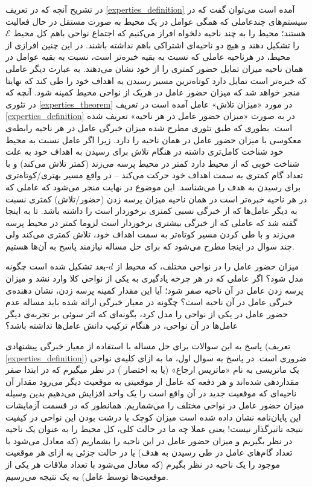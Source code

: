 در تشریح آنچه که در تعریف
\ref{experties_definition}
آمده است می‌توان گفت که در سیستم‌های چندعاملی که همگی عوامل در یک محیط به صورت مستقل در حال فعالیت هستند؛ محیط را به چند ناحیه دلخواه افراز می‌کنیم که اجتماع نواحی باهم کل محیط $\mathcal{E}$ را تشکیل دهند و هیچ دو ناحیه‌ای اشتراکی باهم نداشته باشند. در این چنین افرازی از محیط، در هرناحیه عاملی که نسبت به بقیه خبره‌تر است، نسبت به بقیه عوامل در همان ناحیه میزان تمایل حضور کمتری را از خود نشان می‌دهند. به عبارت دیگر عاملی که خبره‌تر است تمایل دارد کوتاه‌ترین مسیر رسیدن به اهداف خود را طی کند که نهایتا منجر خواهد شد که میزان حضور عامل در هریک از نواحی محیط کمینه شود.
آنچه که در تئوری
\ref{experties_theorem}
در مورد «میزان تلاش» عامل آمده است در تعریف
\ref{experties_definition}
در به صورت «میزان حضور عامل در هر ناحیه» تعریف شده است. بطوری که طبق تئوری مطرح شده میزان خبرگی عامل در هر ناحیه رابطه‌ی معکوسی با میزان حضور عامل در همان ناحیه را دارد. زیرا اگر عامل نسبت به محیط خود شناخت کامل‌تری داشته در هنگام تلاش برای رسیدن به اهداف خود به علت شناخت خوبی که از محیط دارد کمتر در محیط پرسه می‌زند (کمتر تلاش می‌کند) و با تعداد گام کمتری به سمت اهداف خود حرکت می‌کند -- در واقع مسیر بهتری/کوتاه‌تری برای رسیدن به هدف را می‌شناسد. این موضوع در نهایت منجر می‌شود که عاملی که در هر ناحیه خبره‌تر است در همان ناحیه میزان پرسه زدن (حضور/تلاش) کمتری نسبت به دیگر عامل‌ها که از خبرگی نسبی کمتری برخوردار است را داشته باشد.
تا به اینجا گفته شد که عاملی که از خبرگی بیشتری برخوردار است لزوما کمتر در محیط پرسه می‌زند و با طی کردن مسیر کوتاه‌تر به سمت اهداف خود، تلاش کمتری می‌کند ولی چند سوال در اینجا مطرح می‌شود که برای حل مساله نیازمند پاسخ به آن‌ها هستیم.
\begin{enumerate}
 میزان حضور عامل را در نواحی مختلف، که محیط از $d$-بعد تشکیل شده است چگونه مدل شود؟
 اگر عاملی که در هر چرخه یادگیری به یکی از نواحی کلا وارد نشد و میزان پرسه زدن عامل در آن ناحیه صفر شود؛ آیا این مقدار کمینه پرسه زدن، نشان دهنده‌ی خبرگی عامل در آن ناحیه است؟
 چگونه در معیار خبرگی ارائه شده باید مساله عدم حضور عامل در یکی از نواحی را مدل کرد، بگونه‌ای که اثر سوئی بر تجربه‌ی دیگر عامل‌ها در آن نواحی، در هنگام ترکیب دانش عامل‌ها نداشته باشد؟
\end{enumerate}
پاسخ به این سوالات برای حل مساله با استفاده از معیار خبرگی پیشنهادی (تعریف \ref{experties_definition}) ضروری است. در پاسخ به سوال اول، ما به ازای کلیه‌ی نواحی یک ماتریسی به نام «ماتریس ارجاع» (یا به اختصار ) در نظر میگیرم که در ابتدا صفر مقداردهی شده‌اند و هر دفعه که عامل از موقعیتی‌ به موقعیت دیگر می‌رود مقدار آن ناحیه‌ای که موقعیت جدید در آن واقع است را یک واحد افزایش می‌دهیم بدین وسیله میزان حضور عامل در نواحی مختلف را می‌شماریم. همانطور که در قسمت آزمایشات این پایان‌نامه نشان داده شده است میزان کوچک یا درشت بودن این نواحی در کیفیت نتیجه تاثیرگذار نیست! یعنی عملا چه ما در حالت کلی، کل محیط را به عنوان یک ناحیه در نظر بگیریم و میزان حضور عامل در این ناحیه را بشماریم (که معادل می‌شود با تعداد گام‌های عامل در طی رسیدن به هدف) یا در حالت جزئی به ازای هر موقعیت موجود را یک ناحیه در نظر بگیرم (که معادل می‌شود با تعداد ملاقات هر یکی از موقعیت‌ها توسط عامل) به یک نتیجه می‌رسیم.
